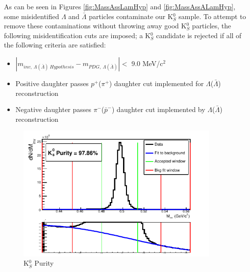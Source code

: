 As can be seen in Figures \ref{fig:MassAssLamHyp} and \ref{fig:MassAssALamHyp}, some misidentified $\Lambda$ and $\bar{\Lambda}$ particles contaminate our K$^{0}_{S}$ sample.  To attempt to remove these contaminations without throwing away good K$^{0}_{S}$ particles, the following misidentification cuts are imposed; a K$^{0}_{S}$ candidate is rejected if all of the following criteria are satisfied:
\begin{itemize}
 \item $|m_{inv, \ \Lambda(\bar{\Lambda}) \ Hypothesis} - m_{PDG,\ \Lambda(\bar{\Lambda})}| < $ 9.0 MeV/c$^{2}$
 \item Positive daughter passes $p^{+}$($\pi^{+}$) daughter cut implemented for $\Lambda$($\bar{\Lambda}$) reconstruction
 \item Negative daughter passes $\pi^{-}$($\bar{p}^{-}$) daughter cut implemented by $\Lambda$($\bar{\Lambda}$) reconstruction
\end{itemize} 


\begin{figure}[h]
  \centering
  \includegraphics[width=100mm]{3_DataSelection/Figures/K0Purity_LamK0.pdf}
  \caption[K$^{0}_{S}$ Purity]{K$^{0}_{S}$ Purity}
  \label{fig:K0Purity}
\end{figure}